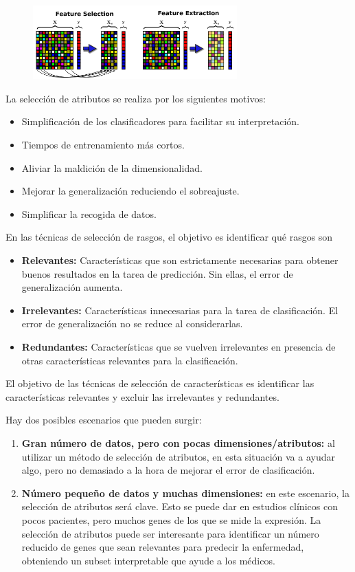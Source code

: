 \begin{figure}[h]
\centering
\includegraphics[width = 0.7\textwidth]{figs/feature-selection-extraction.png}
\end{figure}

La selección de atributos se realiza por los siguientes motivos:
\begin{itemize}
\item Simplificación de los clasificadores para facilitar su interpretación.
\item Tiempos de entrenamiento más cortos.
\item Aliviar la maldición de la dimensionalidad.
\item Mejorar la generalización reduciendo el sobreajuste.
\item Simplificar la recogida de datos.
\end{itemize}

En las técnicas de selección de rasgos, el objetivo es identificar qué rasgos son
\begin{itemize}
\item \textbf{Relevantes:} Características que son estrictamente necesarias para obtener buenos resultados en la tarea de predicción. Sin ellas, el error de generalización aumenta.
\item \textbf{Irrelevantes:} Características innecesarias para la tarea de clasificación. El error de generalización no se reduce al considerarlas.
\item \textbf{Redundantes:} Características que se vuelven irrelevantes en presencia de otras características relevantes para la clasificación.
\end{itemize}

El objetivo de las técnicas de selección de características es identificar las características relevantes y excluir las irrelevantes y redundantes.

Hay dos posibles escenarios que pueden surgir: 
\begin{enumerate}
\item \textbf{Gran número de datos, pero con pocas dimensiones/atributos:} al utilizar un método de selección de atributos, en esta situación va a ayudar algo, pero no demasiado a la hora de mejorar el error de clasificación. 
\item \textbf{Número pequeño de datos y muchas dimensiones:} en este escenario, la selección de atributos será clave. Esto se puede dar en estudios clínicos con pocos pacientes, pero muchos genes de los que se mide la expresión. La selección de atributos puede ser interesante para identificar un número reducido de genes que sean relevantes para predecir la enfermedad, obteniendo un subset interpretable que ayude a los médicos.
\end{enumerate}

